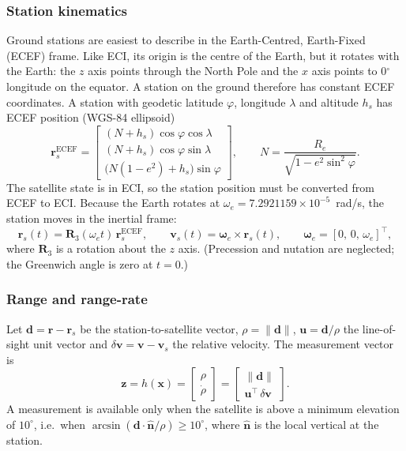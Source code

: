 \documentclass[11pt,a4paper]{article}
\newcommand{\bx}{\mathbf{x}}
\newcommand{\br}{\mathbf{r}}
\newcommand{\bv}{\mathbf{v}}
\newcommand{\bz}{\mathbf{z}}
\newcommand{\bu}{\mathbf{u}}
\newcommand{\bd}{\mathbf{d}}
\newcommand{\T}{^{\top}}
\begin{document}
\subsubsection{Station kinematics}
\label{sec:station}
Ground stations are easiest to describe in the Earth-Centred, Earth-Fixed (ECEF) frame. Like ECI, its origin is the centre of the Earth, but it rotates with the Earth: the $z$ axis points through the North Pole and the $x$ axis points to 0$^\circ$ longitude on the equator. A station on the ground therefore has constant ECEF coordinates. A station with geodetic latitude $\varphi$, longitude $\lambda$ and altitude $h_s$ has ECEF position (WGS-84 ellipsoid)
\begin{equation}
  \br_s^{\text{ECEF}} =
  \begin{bmatrix}
    (N+h_s)\cos\varphi\cos\lambda\\
    (N+h_s)\cos\varphi\sin\lambda\\
    \bigl(N(1-e^2)+h_s\bigr)\sin\varphi
  \end{bmatrix},
  \qquad N=\frac{R_e}{\sqrt{1-e^2\sin^2\varphi}} .
\end{equation}
The satellite state is in ECI, so the station position must be converted from ECEF to ECI. Because the Earth rotates at $\omega_e=7.2921159\times10^{-5}$~rad/s, the station moves in the inertial frame:
\begin{equation}
  \br_s(t)=\mathbf{R}_3(\omega_e t)\,\br_s^{\text{ECEF}},\qquad
  \bv_s(t)=\boldsymbol{\omega}_e\times\br_s(t),\qquad
  \boldsymbol{\omega}_e=[0,\,0,\,\omega_e]\T ,
\end{equation}
where $\mathbf{R}_3$ is a rotation about the $z$ axis. (Precession and nutation are neglected; the Greenwich angle is zero at $t=0$.)

\subsubsection{Range and range-rate}
Let $\bd=\br-\br_s$ be the station-to-satellite vector, $\rho=\|\bd\|$, $\bu=\bd/\rho$ the line-of-sight unit vector and $\delta\bv=\bv-\bv_s$ the relative velocity. The measurement vector is
\begin{equation}
  \bz = h(\bx) =
  \begin{bmatrix}\rho\\ \dot\rho\end{bmatrix}
  =
  \begin{bmatrix}\|\bd\|\\[2pt] \bu\T\,\delta\bv\end{bmatrix}.
\end{equation}
A measurement is available only when the satellite is above a minimum elevation of $10^\circ$, i.e.\ when $\arcsin(\bd\cdot\hat{\mathbf{n}}/\rho)\ge10^\circ$, where $\hat{\mathbf n}$ is the local vertical at the station.
\end{document}
